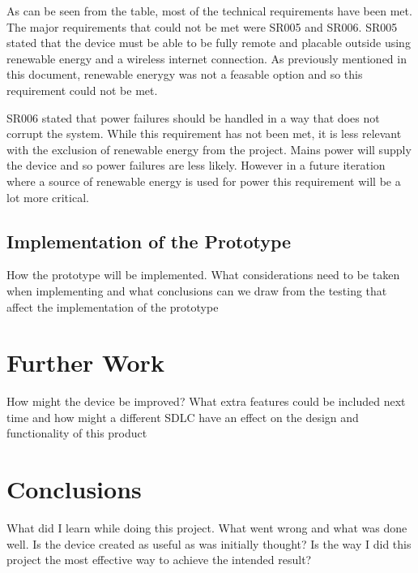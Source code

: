 \documentclass[10pt,a4paper]{article}
\begin{document}
  As can be seen from the table, most of the technical requirements have been met. The major requirements that could not be met were SR005 and SR006. SR005 stated that the device must be able to be fully remote and placable outside using renewable energy and a wireless internet connection. As previously mentioned in this document, renewable enerygy was not a feasable option and so this requirement could not be met. 

  SR006 stated that power failures should be handled in a way that does not corrupt the system. While this requirement has not been met, it is less relevant with the exclusion of renewable energy from the project. Mains power will supply the device and so power failures are less likely. However in a future iteration where a source of renewable energy is used for power this requirement will be a lot more critical.
\subsection{Implementation of the Prototype}
How the prototype will be implemented. What considerations need to be taken when implementing and what conclusions can we draw from the testing that affect the implementation of the prototype

\pagebreak
\section{Further Work}
How might the device be improved? What extra features could be included next time and how might a different SDLC have an effect on the design and functionality of this product

\pagebreak
\section{Conclusions}
What did I learn while doing this project. What went wrong and what was done well. Is the device created as useful as was initially thought? Is the way I did this project the most effective way to achieve the intended result? 

\pagebreak


\end{document}
